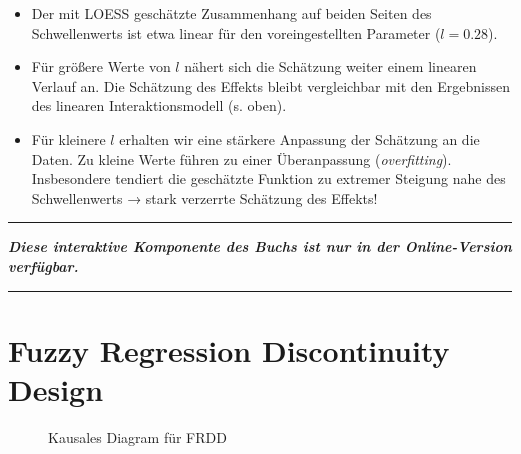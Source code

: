 \documentclass[
  a4paper,
  DIV=11,
  oneside]{scrreprt}
\begin{document}
\begin{itemize}
\item
  Der mit LOESS geschätzte Zusammenhang auf beiden Seiten des
  Schwellenwerts ist etwa linear für den voreingestellten Parameter
  (\(l = 0.28\)).
\item
  Für größere Werte von \(l\) nähert sich die Schätzung weiter einem
  linearen Verlauf an. Die Schätzung des Effekts bleibt vergleichbar mit
  den Ergebnissen des linearen Interaktionsmodell (s. oben).
\item
  Für kleinere \(l\) erhalten wir eine stärkere Anpassung der Schätzung
  an die Daten. Zu kleine Werte führen zu einer Überanpassung
  (\emph{overfitting}). Insbesondere tendiert die geschätzte Funktion zu
  extremer Steigung nahe des Schwellenwerts → stark verzerrte Schätzung
  des Effekts!
\end{itemize}

\begin{center}\rule{0.5\linewidth}{0.5pt}\end{center}

\textbf{\emph{Diese interaktive Komponente des Buchs ist nur in der
Online-Version verfügbar.}}

\begin{center}\rule{0.5\linewidth}{0.5pt}\end{center}

\section{Fuzzy Regression Discontinuity
Design}\label{fuzzy-regression-discontinuity-design}

\begin{figure}[t]


\caption{\label{fig-CDFRDD}Kausales Diagram für FRDD}

\end{figure}%
\end{document}
